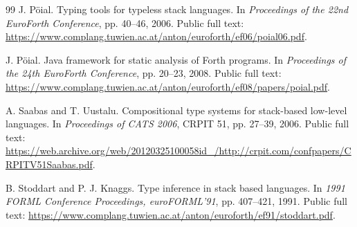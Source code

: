 \documentclass[11pt,a4paper]{article}
\begin{document}
\begin{thebibliography}{99}
J. Pöial.
\newblock Typing tools for typeless stack languages.
\newblock In \emph{Proceedings of the 22nd EuroForth Conference},
pp. 40--46, 2006.
\newblock Public full text:
\url{https://www.complang.tuwien.ac.at/anton/euroforth/ef06/poial06.pdf}.

J. Pöial.
\newblock Java framework for static analysis of Forth programs.
\newblock In \emph{Proceedings of the 24th EuroForth Conference},
pp. 20--23, 2008.
\newblock Public full text:
\url{https://www.complang.tuwien.ac.at/anton/euroforth/ef08/papers/poial.pdf}.

A. Saabas and T. Uustalu.
\newblock Compositional type systems for stack-based low-level languages.
\newblock In \emph{Proceedings of CATS 2006}, CRPIT 51, pp. 27--39, 2006.
\newblock Public full text:
\url{https://web.archive.org/web/20120325100058id_/http://crpit.com/confpapers/CRPITV51Saabas.pdf}.

B. Stoddart and P. J. Knaggs.
\newblock Type inference in stack based languages.
\newblock In \emph{1991 FORML Conference Proceedings, euroFORML'91},
pp. 407--421, 1991.
\newblock Public full text:
\url{https://www.complang.tuwien.ac.at/anton/euroforth/ef91/stoddart.pdf}.

\end{thebibliography}
\end{document}
